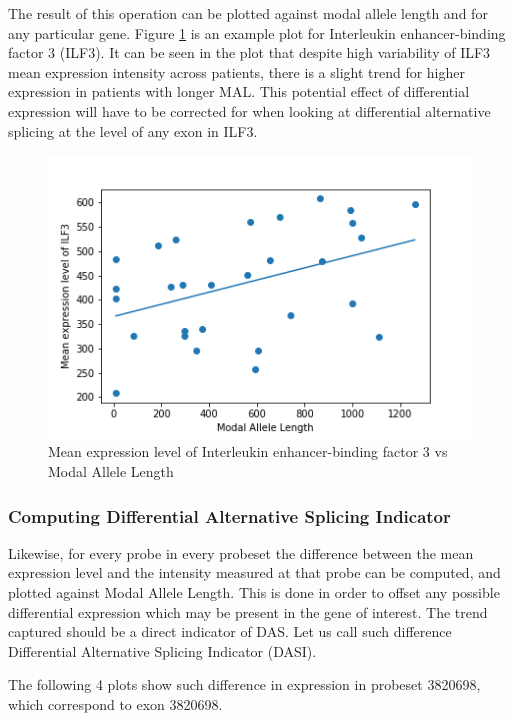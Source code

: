 The result of this operation can be plotted against modal allele length and for any particular gene. Figure \ref{avgILF3} is an example plot for Interleukin enhancer-binding factor 3 (ILF3). It can be seen in the plot that despite high variability of ILF3 mean expression intensity across patients, there is a slight trend for higher expression in patients with longer MAL. This potential effect of differential expression will have to be corrected for when looking at differential alternative splicing at the level of any exon in ILF3.

\begin{figure}[ht]
	\centering
	\includegraphics[width=135mm]{avgILF3.png}
	\caption{Mean expression level of Interleukin enhancer-binding factor 3 vs Modal Allele Length}
	\label{avgILF3}
\end{figure}

\subsubsection{Computing Differential Alternative Splicing Indicator} \label{subsection_DASI}

Likewise, for every probe in every probeset the difference between the mean expression level and the intensity measured at that probe can be computed, and plotted against Modal Allele Length. This is done in order to offset any possible differential expression which may be present in the gene of interest. The trend captured should be a direct indicator of DAS. Let us call such difference Differential Alternative Splicing Indicator (DASI).

The following 4 plots show such difference in expression in probeset 3820698, which correspond to exon 3820698.

